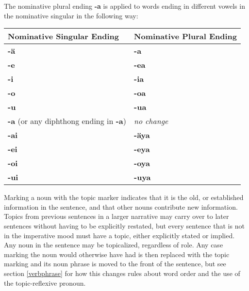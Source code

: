 \documentclass{article}
\begin{document}
The nominative plural ending \textbf{-a} is applied to words ending in different vowels in the nominative singular in the following way:

\begin{table}[h]
\begin{tabular}{l|l}
Nominative Singular Ending & Nominative Plural Ending \\
\hline
\textbf{-\"a} & \textbf{-a} \\
\textbf{-e} & \textbf{-ea} \\
\textbf{-i} & \textbf{-ia} \\
\textbf{-o} & \textbf{-oa} \\
\textbf{-u} & \textbf{-ua} \\
\textbf{-a} (or any diphthong ending in \textbf{-a}) & \emph{no change} \\
\textbf{-ai} & \textbf{-\"aya} \\
\textbf{-ei} & \textbf{-eya} \\
\textbf{-oi} & \textbf{-oya} \\
\textbf{-ui} & \textbf{-uya} \\
\end{tabular}
\end{table}

Marking a noun with the topic marker indicates that it is the old, or established information in the sentence, and that other nouns contribute new information. Topics from previous sentences in a larger narrative may carry over to later sentences without having to be explicitly restated, but every sentence that is not in the imperative mood must have a topic, either explicitly stated or implied.  Any noun in the sentence may be topicalized, regardless of role. Any case marking the noun would otherwise have had is then replaced with the topic marking and its noun phrase is moved to the front of the sentence, but see section \ref{verbphrase} for how this changes rules about word order and the use of the topic-reflexive pronoun.
\end{document}
